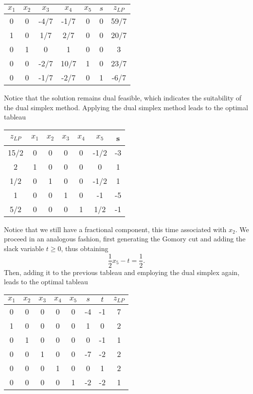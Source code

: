 \begin{center}
	\begin{tabular}{cccccc|c}
		$x_1$ & $x_2$ & $x_3$ & $x_4$ & $x_5$ & $s$ & $z_{LP}$ \\ \hline
		0 & 0 & -4/7 & -1/7 &  0 & 0 & 59/7 \\ \hline
		1 & 0 & 1/7 & 2/7   &  0 & 0 & 20/7 \\
		0 & 1 &  0  &  1    &  0 & 0 & 3    \\
		0 & 0 &-2/7 & 10/7  &  1 & 0 & 23/7 \\
		0 & 0 &-1/7 & -2/7  &  0 & 1 & -6/7 
	\end{tabular}	
\end{center}


Notice that the solution remains dual feasible, which indicates the suitability of the dual simplex method. Applying the dual simplex method leads to the optimal tableau 

\begin{center}
	\begin{tabular}{c|cccccc}
		$z_{LP}$ & $x_1$ & $x_2$ & $x_3$ & $x_4$ & $x_5$ & s\\ \hline
		15/2 & 0 & 0 & 0 &  0  & -1/2 & -3 \\ \hline
		2   & 1 & 0 & 0 &  0  &  0   &  1 \\
		1/2  & 0 & 1 & 0 &  0  & -1/2 &  1 \\
		1    & 0 & 0 & 1 &  0  & -1   & -5 \\ 
		5/2  & 0 & 0 & 0 &  1  &  1/2 & -1
	\end{tabular}	
\end{center}

Notice that we still have a fractional component, this time associated with $x_2$. We proceed in an analogous fashion, first generating the Gomory cut and adding the slack variable $t \ge 0$, thus obtaining 
%
\begin{equation*}
	\frac{1}{2}x_5 - t = \frac{1}{2}.
\end{equation*}
%
Then, adding it to the previous tableau and employing the dual simplex again, leads to the optimal tableau

\begin{center}
	\begin{tabular}{ccccccc|c}
	$x_1$ & $x_2$ & $x_3$ & $x_4$ & $x_5$ & $s$ & $t$ & $z_{LP}$ \\ \hline
	0  &  0  &  0  &  0  &  0  & -4  & -1  &  7  \\ \hline 
	1  &  0  &  0  &  0  &  0  &  1  & 0   &  2  \\ 
	0  &  1  &  0  &  0  &  0  &  0  & -1  &  1  \\
	0  &  0  &  1  &  0  &  0  & -7  & -2  &  2  \\ 
	0  &  0  &  0  &  1  &  0  &  0  &  1  &  2  \\
	0  &  0  &  0  &  0  &  1  & -2  & -2  &  1 
	\end{tabular}
\end{center}

